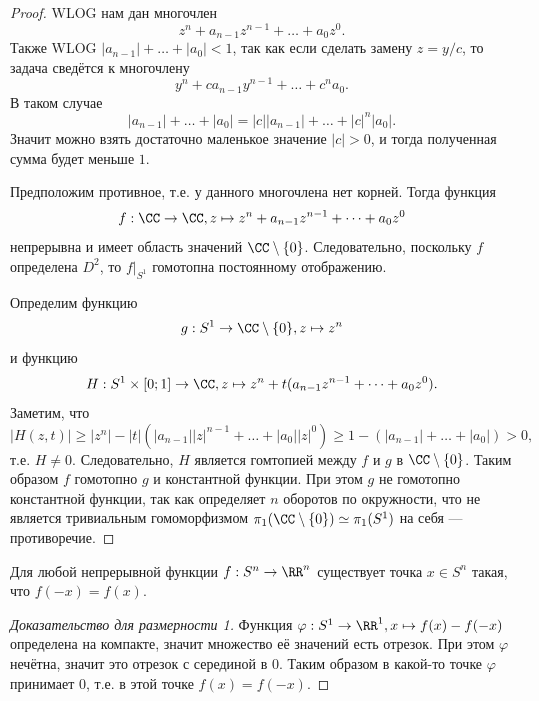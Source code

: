 \documentclass[12pt,a4paper]{article}
\begin{document}
    \begin{proof}
        WLOG нам дан многочлен
        \[z^n + a_{n-1} z^{n-1} + \dots + a_0 z^0.\]
        Также WLOG $|a_{n-1}| + \dots + |a_0| < 1$, так как если сделать замену $z = y/c$, то задача сведётся к многочлену
        \[y^n + c a_{n-1} y^{n-1} + \dots + c^n a_0.\]
        В таком случае
        \[|a_{n-1}| + \dots + |a_0| = |c| |a_{n-1}| + \dots + |c|^n |a_0|.\]
        Значит можно взять достаточно маленькое значение $|c| > 0$, и тогда полученная сумма будет меньше $1$.

        Предположим противное, т.е. у данного многочлена нет корней. Тогда функция
        \[f: \CC \to \CC, z \mapsto z^n + a_{n-1} z^{n-1} + \dots + a_0 z^0\]
        непрерывна и имеет область значений $\CC \setminus \{0\}$. Следовательно, поскольку $f$ определена $D^2$, то $f|_{S^1}$ гомотопна постоянному отображению.
        
        Определим функцию
        \[g: S^1 \to \CC \setminus \{0\}, z \mapsto z^n\]
        и функцию
        \[H: S^1 \times [0; 1] \to \CC, z \mapsto z^n + t(a_{n-1} z^{n-1} + \dots + a_0 z^0).\]
        Заметим, что
        \[|H(z, t)| \geqslant |z^n| - |t|(|a_{n-1}| |z|^{n-1} + \dots + |a_0| |z|^0) \geqslant 1 - (|a_{n-1}| + \dots + |a_0|) > 0,\]
        т.е. $H \neq 0$. Следовательно, $H$ является гомтопией между $f$ и $g$ в $\CC \setminus \{0\}$. Таким образом $f$ гомотопно $g$ и константной функции. При этом $g$ не гомотопно константной функции, так как определяет $n$ оборотов по окружности, что не является тривиальным гомоморфизмом $\pi_1(\CC \setminus \{0\}) \simeq \pi_1(S^1)$ на себя --- противоречие.
    \end{proof}

    \begin{theorem}
        Для любой непрерывной функции $f: S^n \to \RR^n$ существует точка $x \in S^n$ такая, что $f(-x) = f(x)$.
    \end{theorem}

    \begin{proof}[Доказательство для размерности 1]
        Функция $\varphi: S^1 \to \RR^1, x \mapsto f(x) - f(-x)$ определена на компакте, значит множество её значений есть отрезок. При этом $\varphi$ нечётна, значит это отрезок с серединой в $0$. Таким образом в какой-то точке $\varphi$ принимает $0$, т.е. в этой точке $f(x) = f(-x)$.
    \end{proof}
\end{document}
